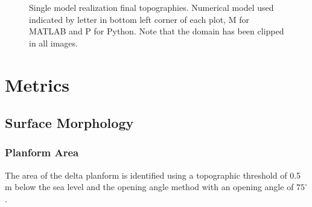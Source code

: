 \begin{figure}[!ht]
	\caption{Single model realization final topographies. Numerical model used indicated by letter in bottom left corner of each plot, M for MATLAB and P for Python. Note that the domain has been clipped in all images.}
	\label{fig:finaltopo}
\end{figure}

\section{Metrics}

\subsection{Surface Morphology}

\subsubsection{Planform Area}
The area of the delta planform is identified using a topographic threshold of 0.5 m below the sea level \cite{Liang2016a,Liang2016} and the opening angle method \cite{Shaw2008} with an opening angle of $75^{\circ}$.

